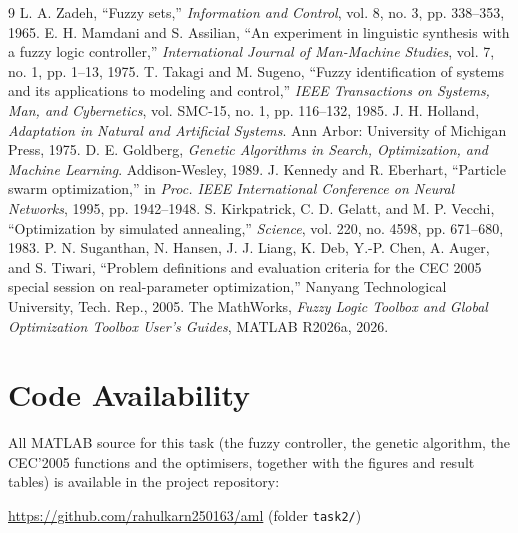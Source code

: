 \documentclass[11pt,a4paper]{article}
\begin{document}
\begin{thebibliography}{9}
 L. A. Zadeh, ``Fuzzy sets,'' \emph{Information and Control}, vol. 8, no. 3, pp. 338--353, 1965.
 E. H. Mamdani and S. Assilian, ``An experiment in linguistic synthesis with a fuzzy logic controller,'' \emph{International Journal of Man-Machine Studies}, vol. 7, no. 1, pp. 1--13, 1975.
 T. Takagi and M. Sugeno, ``Fuzzy identification of systems and its applications to modeling and control,'' \emph{IEEE Transactions on Systems, Man, and Cybernetics}, vol. SMC-15, no. 1, pp. 116--132, 1985.
 J. H. Holland, \emph{Adaptation in Natural and Artificial Systems}. Ann Arbor: University of Michigan Press, 1975.
 D. E. Goldberg, \emph{Genetic Algorithms in Search, Optimization, and Machine Learning}. Addison-Wesley, 1989.
 J. Kennedy and R. Eberhart, ``Particle swarm optimization,'' in \emph{Proc. IEEE International Conference on Neural Networks}, 1995, pp. 1942--1948.
 S. Kirkpatrick, C. D. Gelatt, and M. P. Vecchi, ``Optimization by simulated annealing,'' \emph{Science}, vol. 220, no. 4598, pp. 671--680, 1983.
 P. N. Suganthan, N. Hansen, J. J. Liang, K. Deb, Y.-P. Chen, A. Auger, and S. Tiwari, ``Problem definitions and evaluation criteria for the CEC 2005 special session on real-parameter optimization,'' Nanyang Technological University, Tech. Rep., 2005.
 The MathWorks, \emph{Fuzzy Logic Toolbox and Global Optimization Toolbox User's Guides}, MATLAB R2026a, 2026.
\end{thebibliography}

\clearpage
\appendix
\section{Code Availability}
All MATLAB source for this task (the fuzzy controller, the genetic algorithm, the CEC'2005 functions and
the optimisers, together with the figures and result tables) is available in the project repository:

\begin{center}
\url{https://github.com/rahulkarn250163/aml} \quad (folder \texttt{task2/})
\end{center}
\end{document}
